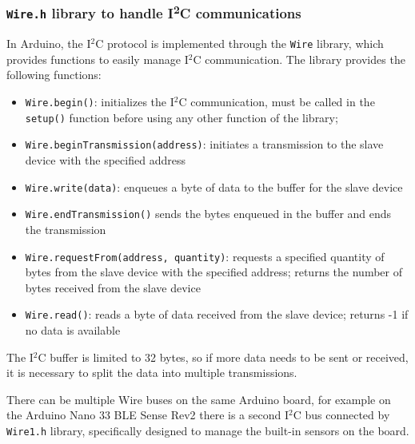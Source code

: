 \subsubsection*{\texorpdfstring{\texttt{Wire.h}}{Wire} library to handle I\texorpdfstring{\textsuperscript{2}}{2}C communications}
In Arduino, the I\(^2\)C protocol is implemented through the \texttt{Wire} library, which provides functions to easily manage
I\(^2\)C communication. The library provides the following functions:
\begin{itemize}
	\item \texttt{Wire.begin()}: initializes the I\(^2\)C communication, must be called in the \texttt{setup()} function before
	using any other function of the library;
	\item \texttt{Wire.beginTransmission(address)}: initiates a transmission to the slave device with the specified address
	\item \texttt{Wire.write(data)}: enqueues a byte of data to the buffer for the slave device
	\item \texttt{Wire.endTransmission()} sends the bytes enqueued in the buffer and ends the transmission
	\item \texttt{Wire.requestFrom(address, quantity)}: requests a specified quantity of bytes from the slave device with the
	specified address; returns the number of bytes received from the slave device
	\item \texttt{Wire.read()}: reads a byte of data received from the slave device; returns -1 if no data is available
\end{itemize}
The I\(^2\)C buffer is limited to 32 bytes, so if more data needs to be sent or received, it is necessary to split the data
into multiple transmissions.

There can be multiple Wire buses on the same Arduino board, for example on the Arduino Nano 33 BLE Sense Rev2 there is a second
I\(^2\)C bus connected by \texttt{Wire1.h} library, specifically designed to manage the built-in sensors on the board.

